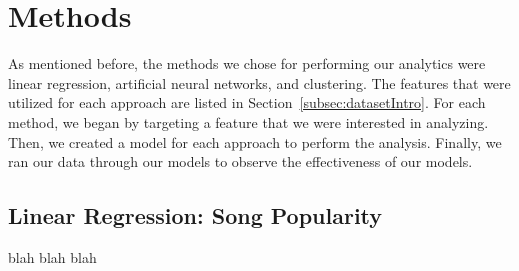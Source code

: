 \documentclass[12pt]{article}
\begin{document}
\section{Methods}
\label{sec:methods}
As mentioned before, the methods we chose for performing our analytics were linear regression, artificial neural networks, and clustering. The features that were utilized for each approach are listed in Section~\ref{subsec:datasetIntro}. For each method, we began by targeting a feature that we were interested in analyzing. Then, we created a model for each approach to perform the analysis. Finally, we ran our data through our models to observe the effectiveness of our models. 

\subsection{Linear Regression: Song Popularity}
\label{subsec:linearRegression}
blah blah blah

\end{document}
